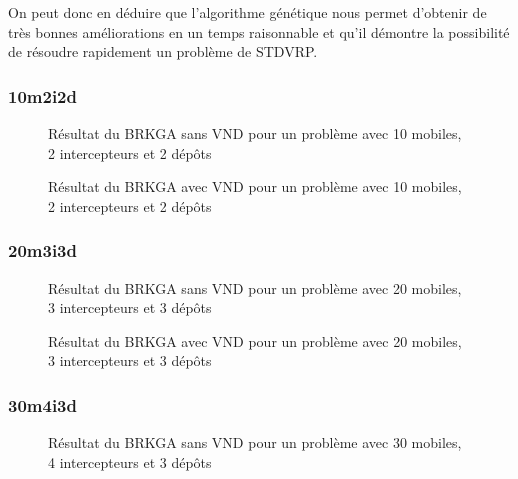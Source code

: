             On peut donc en déduire que l'algorithme génétique nous permet d'obtenir de très bonnes améliorations en un temps raisonnable et qu'il démontre la possibilité de résoudre rapidement un problème de STDVRP.
            
            \subsubsection{10m2i2d}
                
                \begin{figure}[H]
                	
                \caption{Résultat du BRKGA sans VND pour un problème avec 10 mobiles, 2 intercepteurs et 2 dépôts}
				\label{fig:10m2i2d-sansvnd}
				\end{figure}
                
                \begin{figure}[H]
                	
                \caption{Résultat du BRKGA avec VND pour un problème avec 10 mobiles, 2 intercepteurs et 2 dépôts}
				\label{fig:10m2i2d-avecvnd}
				\end{figure}
				
            \subsubsection{20m3i3d}
                \begin{figure}[H]
                	
                \caption{Résultat du BRKGA sans VND pour un problème avec 20 mobiles, 3 intercepteurs et 3 dépôts}
				\label{fig:20m3i3d-sansvnd}
				\end{figure}
                
                \begin{figure}[H]
                	
                \caption{Résultat du BRKGA avec VND pour un problème avec 20 mobiles, 3 intercepteurs et 3 dépôts}
				\label{fig:20m3i3d-avecvnd}
				\end{figure}
				
            \subsubsection{30m4i3d}
           		\begin{figure}[H]
                	
                \caption{Résultat du BRKGA sans VND pour un problème avec 30 mobiles, 4 intercepteurs et 3 dépôts}
				\label{fig:30m4i3d-sansvnd}
                \end{figure}
                
